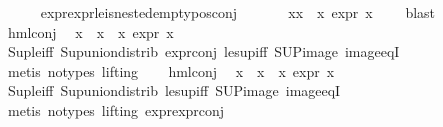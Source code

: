 \begin{isabellebody}
\ \ \ \ \isamarkupfalse%
\ expr{\isacharunderscore}{\kern0pt}{}{\isacharunderscore}{\kern0pt}expr{\isacharunderscore}{\kern0pt}{}{\isacharunderscore}{\kern0pt}le{\isacharunderscore}{\kern0pt}{}{\isacharunderscore}{\kern0pt}is{\isacharunderscore}{\kern0pt}nested{\isacharunderscore}{\kern0pt}empty{\isacharunderscore}{\kern0pt}pos{\isacharunderscore}{\kern0pt}conj\ \isanewline
\ \ \ \ \isamarkupfalse%
\ {\isacartoucheopen}{\isasymforall}x{\isasymin}x{}\ {\isacharbackquote}{\kern0pt}\ x{}{\isachardot}{\kern0pt}\ expr{\isacharunderscore}{\kern0pt}{}\ x\ {\isasymle}\ {}{\isacartoucheclose}\ \isamarkupfalse%
\ blast\isanewline
\ \ \isamarkupfalse%
\ hml{\isacharunderscore}{\kern0pt}conj\ \isamarkupfalse%
\ {\isachardoublequoteopen}{\isasymforall}x\ {\isasymin}\ x{}\ {\isacharbackquote}{\kern0pt}\ x{}{\isachardot}{\kern0pt}\ expr{\isacharunderscore}{\kern0pt}{}\ x\ {\isasymle}\ {}{\isachardoublequoteclose}\isanewline
\ \ \ \ \isamarkupfalse%
\ Sup{\isacharunderscore}{\kern0pt}le{\isacharunderscore}{\kern0pt}iff\ Sup{\isacharunderscore}{\kern0pt}union{\isacharunderscore}{\kern0pt}distrib\ expr{\isacharunderscore}{\kern0pt}{}{\isacharunderscore}{\kern0pt}conj\ le{\isacharunderscore}{\kern0pt}sup{\isacharunderscore}{\kern0pt}iff\ SUP{\isacharunderscore}{\kern0pt}image\ image{\isacharunderscore}{\kern0pt}eqI\isanewline
\ \ \ \ \isamarkupfalse%
\ {\isacharparenleft}{\kern0pt}metis\ {\isacharparenleft}{\kern0pt}no{\isacharunderscore}{\kern0pt}types{\isacharcomma}{\kern0pt}\ lifting{\isacharparenright}{\kern0pt}{\isacharparenright}{\kern0pt}\isanewline
\ \ \isamarkupfalse%
\ hml{\isacharunderscore}{\kern0pt}conj\ \isamarkupfalse%
\ {\isachardoublequoteopen}{\isasymforall}x\ {\isasymin}\ x{}\ {\isacharbackquote}{\kern0pt}\ x{}{\isachardot}{\kern0pt}\ expr{\isacharunderscore}{\kern0pt}{}\ x\ {\isasymle}\ {}{\isachardoublequoteclose}\isanewline
\ \ \ \ \isamarkupfalse%
\ Sup{\isacharunderscore}{\kern0pt}le{\isacharunderscore}{\kern0pt}iff\ Sup{\isacharunderscore}{\kern0pt}union{\isacharunderscore}{\kern0pt}distrib\ le{\isacharunderscore}{\kern0pt}sup{\isacharunderscore}{\kern0pt}iff\ SUP{\isacharunderscore}{\kern0pt}image\ image{\isacharunderscore}{\kern0pt}eqI\isanewline
\ \ \ \ \isamarkupfalse%
\ {\isacharparenleft}{\kern0pt}metis\ {\isacharparenleft}{\kern0pt}no{\isacharunderscore}{\kern0pt}types{\isacharcomma}{\kern0pt}\ lifting{\isacharparenright}{\kern0pt}\ expr{\isacharunderscore}{\kern0pt}{}{\isachardot}{\kern0pt}expr{\isacharunderscore}{\kern0pt}{}{\isacharunderscore}{\kern0pt}conj{\isacharparenright}{\kern0pt}\isanewline

\end{isabellebody}
